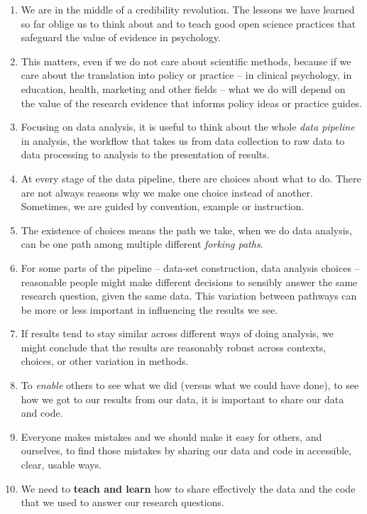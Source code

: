 \documentclass[
  letterpaper,
  DIV=11,
  numbers=noendperiod]{scrreprt}
\providecommand{\tightlist}{%
  \setlength{\itemsep}{0pt}\setlength{\parskip}{0pt}}\usepackage{longtable,booktabs,array}
\begin{document}
\begin{enumerate}
\def\labelenumi{\arabic{enumi}.}
\tightlist
\item
  We are in the middle of a credibility revolution. The lessons we have
  learned so far oblige us to think about and to teach good open science
  practices that safeguard the value of evidence in psychology.
\item
  This matters, even if we do not care about scientific methods, because
  if we care about the translation into policy or practice -- in
  clinical psychology, in education, health, marketing and other fields
  -- what we do will depend on the value of the research evidence that
  informs policy ideas or practice guides.
\item
  Focusing on data analysis, it is useful to think about the whole
  \emph{data pipeline} in analysis, the workflow that takes us from data
  collection to raw data to data processing to analysis to the
  presentation of results.
\item
  At every stage of the data pipeline, there are choices about what to
  do. There are not always reasons why we make one choice instead of
  another. Sometimes, we are guided by convention, example or
  instruction.
\item
  The existence of choices means the path we take, when we do data
  analysis, can be one path among multiple different \emph{forking
  paths}.
\item
  For some parts of the pipeline -- data-set construction, data analysis
  choices -- reasonable people might make different decisions to
  sensibly answer the same research question, given the same data. This
  variation between pathways can be more or less important in
  influencing the results we see.
\item
  If results tend to stay similar across different ways of doing
  analysis, we might conclude that the results are reasonably robust
  across contexts, choices, or other variation in methods.
\item
  To \emph{enable} others to see what we did (versus what we could have
  done), to see how we got to our results from our data, it is important
  to share our data and code.
\item
  Everyone makes mistakes and we should make it easy for others, and
  ourselves, to find those mistakes by sharing our data and code in
  accessible, clear, usable ways.
\item
  We need to \textbf{teach and learn} how to share effectively the data
  and the code that we used to answer our research questions.
\end{enumerate}
\end{document}
